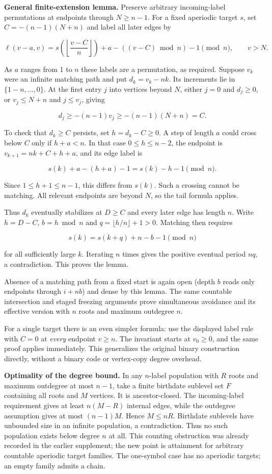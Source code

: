 \documentclass[
  11pt,
]{article}
\begin{document}
\textbf{General finite-extension lemma.} Preserve arbitrary
incoming-label permutations at endpoints through \(N\ge n-1\). For a
fixed aperiodic target \(s\), set \(C=-(n-1)(N+n)\) and label all later
edges by

\[\ell(v-a,v)=s\!\left(\left\lfloor\frac{v-C}{n}\right\rfloor\right)
+a-((v-C)\bmod n)-1\pmod n,\qquad v>N.\]

As \(a\) ranges from 1 to \(n\) these labels are a permutation, as
required. Suppose \(v_k\) were an infinite matching path and put
\(d_k=v_k-nk\). Its increments lie in \(\{1-n,\ldots,0\}\). At the first
entry \(j\) into vertices beyond \(N\), either \(j=0\) and \(d_j\ge0\),
or \(v_j\le N+n\) and \(j\le v_j\), giving

\[d_j\ge-(n-1)v_j\ge-(n-1)(N+n)=C.\]

To check that \(d_k\ge C\) persists, set \(h=d_k-C\ge0\). A step of
length \(a\) could cross below \(C\) only if \(h+a<n\). In that case
\(0\le h\le n-2\), the endpoint is \(v_{k+1}=nk+C+h+a\), and its edge
label is

\[s(k)+a-(h+a)-1=s(k)-h-1\pmod n.\]

Since \(1\le h+1\le n-1\), this differs from \(s(k)\). Such a crossing
cannot be matching. All relevant endpoints are beyond \(N\), so the tail
formula applies.

Thus \(d_k\) eventually stabilizes at \(D\ge C\) and every later edge
has length \(n\). Write \(h=D-C\), \(b=h\bmod n\) and
\(q=\lfloor h/n\rfloor+1>0\). Matching then requires

\[s(k)=s(k+q)+n-b-1\pmod n\]

for all sufficiently large \(k\). Iterating \(n\) times gives the
positive eventual period \(nq\), a contradiction. This proves the lemma.

Absence of a matching path from a fixed start is again open (depth \(b\)
reads only endpoints through \(i+nb\)) and dense by this lemma. The same
countable intersection and staged freezing arguments prove simultaneous
avoidance and its effective version with \(n\) roots and maximum
outdegree \(n\).

For a single target there is an even simpler formula: use the displayed
label rule with \(C=0\) at \emph{every} endpoint \(v\ge n\). The
invariant starts at \(v_0\ge0\), and the same proof applies immediately.
This generalizes the original binary construction directly, without a
binary code or vertex-copy degree overhead.

\textbf{Optimality of the degree bound.} In any \(n\)-label population
with \(R\) roots and maximum outdegree at most \(n-1\), take a finite
birthdate sublevel set \(F\) containing all roots and \(M\) vertices. It
is ancestor-closed. The incoming-label requirement gives at least
\(n(M-R)\) internal edges, while the outdegree assumption gives at most
\((n-1)M\). Hence \(M\le nR\). Birthdate sublevels have unbounded size
in an infinite population, a contradiction. Thus no such population
exists below degree \(n\) at all. This counting obstruction was already
recorded in the earlier supplement; the new point is attainment for
arbitrary countable aperiodic target families. The one-symbol case has
no aperiodic targets; an empty family admits a chain.
\end{document}
